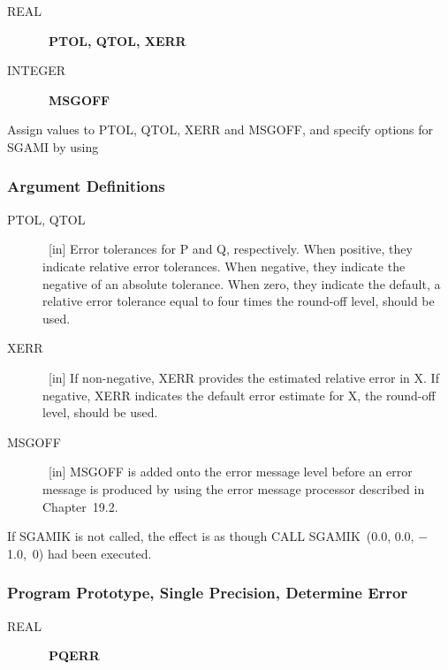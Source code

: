 \documentclass[twoside]{MATH77}
\begin{document}
\begin{description}
\item[REAL]  \ {\bf PTOL, QTOL, XERR}

\item[INTEGER]  \ {\bf MSGOFF}
\end{description}

Assign values to PTOL, QTOL, XERR and MSGOFF, and specify options for SGAMI
by using

\begin{center}
\end{center}

\subsubsection{Argument Definitions}

\begin{description}
\item[PTOL, QTOL]  \ [in] Error tolerances for P and Q, respectively. When
positive, they indicate relative error tolerances. When negative, they
indicate the negative of an absolute tolerance. When zero, they indicate the
default, a relative error tolerance equal to four times the round-off level,
should be used.

\item[XERR]  \ [in] If non-negative, XERR provides the estimated relative
error in X. If negative, XERR indicates the default error estimate for X,
the round-off level, should be used.

\item[MSGOFF]  \ [in] MSGOFF is added onto the error message level before an
error message is produced by using the error message processor described in
Chapter~19.2.
\end{description}

If SGAMIK is not called, the effect is as though CALL SGAMIK~(0.0, 0.0, $-$%
1.0,~0) had been executed.

\subsubsection{Program Prototype, Single Precision, Determine Error}

\begin{description}
\item[REAL]  \ {\bf PQERR}
\end{description}
\end{document}
